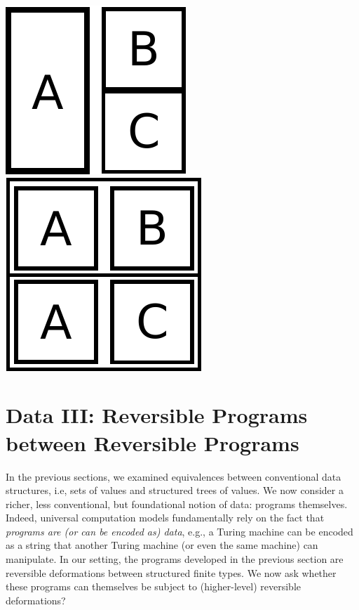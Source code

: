 \documentclass{article}
\begin{document}
\begin{center}
\qquad\qquad\qquad
\includegraphics[scale=0.3]{images/distrib-1}
\qquad
\includegraphics[scale=0.3]{images/distrib-2}
\end{center}

\section{Data III: Reversible Programs between Reversible Programs}
\label{sec:pi2}

In the previous sections, we examined equivalences between
conventional data structures, i.e, sets of values and structured trees
of values. We now consider a richer, less conventional, but
foundational notion of data: programs themselves. Indeed, universal
computation models fundamentally rely on the fact that \emph{programs
are (or can be encoded as) data}, e.g., a Turing machine can be
encoded as a string that another Turing machine (or even the same
machine) can manipulate. In our setting, the programs developed in the
previous section are reversible deformations between structured finite
types. We now ask whether these programs can themselves
be subject to (higher-level) reversible deformations?
\end{document}
